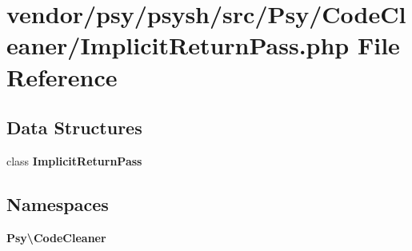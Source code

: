 \section{vendor/psy/psysh/src/\+Psy/\+Code\+Cleaner/\+Implicit\+Return\+Pass.php File Reference}
\label{_implicit_return_pass_8php}
\subsection*{Data Structures}
\begin{DoxyCompactItemize}
\item 
class {\bf Implicit\+Return\+Pass}
\end{DoxyCompactItemize}
\subsection*{Namespaces}
\begin{DoxyCompactItemize}
\item 
 {\bf Psy\textbackslash{}\+Code\+Cleaner}
\end{DoxyCompactItemize}
